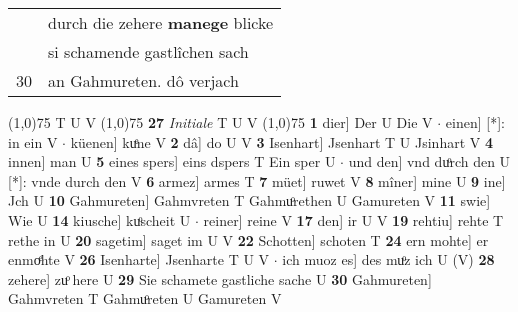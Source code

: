 \documentclass[8pt,a4paper,notitlepage]{article}
\begin{document}
\begin{table}[ht]
\begin{minipage}[t]{0.5\linewidth}
\begin{tabular}{rl}
 & durch die zehere \textbf{manege} blicke\\ 
 & si schamende gastlîchen sach\\ 
30 & an Gahmureten. dô verjach\\ 
\end{tabular}
\scriptsize
\line(1,0){75} \newline
T U V \newline
\line(1,0){75} \newline
\textbf{27} \textit{Initiale} T U V  \newline
\line(1,0){75} \newline
\textbf{1} dier] Der U Die V  $\cdot$ einen] [*]: in ein V  $\cdot$ küenen] kuͤne V \textbf{2} dâ] do U V \textbf{3} Isenhart] Jsenhart T U Jsinhart V \textbf{4} innen] man U \textbf{5} eines spers] eins dspers T Ein sper U  $\cdot$ und den] vnd duͦrch den U [*]: vnde durch den V \textbf{6} armez] armes T \textbf{7} müet] ruwet V \textbf{8} mîner] mine U \textbf{9} ine] Jch U \textbf{10} Gahmureten] Gahmvreten T Gahmuͦrethen U Gamureten V \textbf{11} swie] Wie U \textbf{14} kiusche] kuͦscheit U  $\cdot$ reiner] reine V \textbf{17} den] ir U V \textbf{19} rehtiu] rehte T rethe in U \textbf{20} sagetim] saget im U V \textbf{22} Schotten] schoten T \textbf{24} ern mohte] er enmoͤhte V \textbf{26} Isenharte] Jsenharte T U V  $\cdot$ ich muoz es] des muͦz ich U (V) \textbf{28} zehere] zuͦ here U \textbf{29} Sie schamete gastliche sache U \textbf{30} Gahmureten] Gahmvreten T Gahmuͦreten U Gamureten V \newline
\end{minipage}
\end{table}
\end{document}

